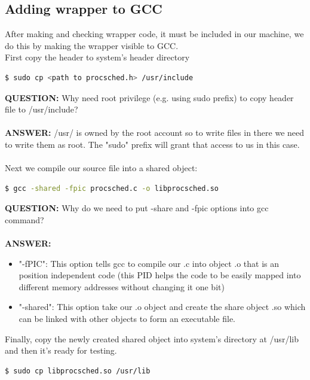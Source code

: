 \documentclass[a4paper]{article}
\begin{document}
\subsection{Adding wrapper to GCC}
After making and checking wrapper code, it must be included in our machine, we do this by making the wrapper visible to GCC.\\
First copy the header to system's header directory
\begin{lstlisting}[language=bash]
$ sudo cp <path to procsched.h> /usr/include
\end{lstlisting}
\textbf{QUESTION:} Why need root privilege (e.g. using sudo prefix) to copy header file to /usr/include?\\\\
\textbf{ANSWER:} /usr/ is owned by the root account so to write files in there we need to write them as root. The "sudo" prefix will grant that access to us in this case.\\\\
Next we compile our source file into a shared object:
\begin{lstlisting}[language=bash]
$ gcc -shared -fpic procsched.c -o libprocsched.so
\end{lstlisting}
\textbf{QUESTION:} Why do we need to put -share and -fpic options into gcc command?\\\\
\textbf{ANSWER:} 
\begin{itemize}
\item "-fPIC": This option tells gcc to compile our .c into object .o that is an position independent code (this PID helps the code to be easily mapped into different memory addresses without changing it one bit)
\item "-shared": This option take our .o object and create the share object .so which can be linked with other objects to form an executable file.
\end{itemize}
Finally, copy the newly created shared object into system's directory at /usr/lib and then it's ready for testing.
\begin{lstlisting}[language=bash]
$ sudo cp libprocsched.so /usr/lib
\end{lstlisting}
\end{document}
